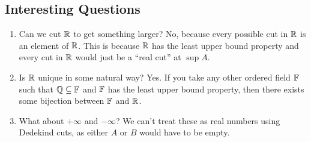 \documentclass[class=article, crop=false]{standalone}
\begin{document}
  \subsection{Interesting Questions}
  \begin{enumerate}[label=(\alph*)]
    \item Can we cut $\mathbb{R}$ to get something larger? No, because every possible cut in $\mathbb{R}$ is an element of $\mathbb{R}$. This is because $\mathbb{R}$ has the least upper bound property and every cut in $\mathbb{R}$ would just be a ``real cut'' at $\sup A$.
    \item Is $\mathbb{R}$ unique in some natural way? Yes. If you take any other ordered field $\mathbb{F}$ such that $\mathbb{Q}\subseteq \mathbb{F}$ and $\mathbb{F}$ has the least upper bound property, then there exists some bijection between $\mathbb{F}$ and $\mathbb{R}$.
    \item What about $+\infty$ and $-\infty$? We can't treat these as real numbers using Dedekind cuts, as either $A$ or $B$ would have to be empty.
  \end{enumerate}
\end{document}
